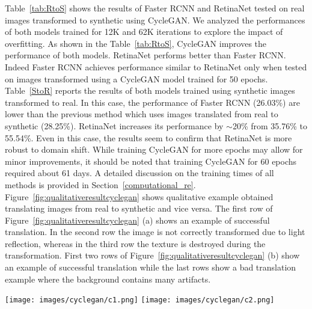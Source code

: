 \documentclass[preprint]{elsarticle}
\begin{document}
Table~\ref{tab:RtoS} shows the results of Faster RCNN and RetinaNet tested on real images transformed to synthetic using CycleGAN. We analyzed the performances of both models trained for 12K and 62K iterations to explore the impact of overfitting. As shown in the Table~\ref{tab:RtoS}, CycleGAN improves the performance of both models. RetinaNet performs better than Faster RCNN. Indeed Faster RCNN achieves performance similar to RetinaNet only when tested on images transformed using a CycleGAN model trained for 50 epochs. Table~\ref{StoR} reports the results of both models trained using synthetic images transformed to real. In this case, the performance of Faster RCNN (26.03\%) are lower than the previous method which uses images translated from real to synthetic (28.25\%). RetinaNet increases its performance by $\sim$20\% from 35.76\% to 55.54\%. Even in this case, the results seem to confirm that RetinaNet is more robust to domain shift. While training CycleGAN for more epochs may allow for minor improvements, it should be noted that training CycleGAN for 60 epochs required about 61 days.
A detailed discussion on the training times of all methods is provided in Section~\ref{computational_re}. Figure~\ref{fig:qualitativeresultcyclegan} shows qualitative example obtained translating images from real to synthetic and vice versa. The first row of Figure~\ref{fig:qualitativeresultcyclegan} (a) shows an example of successful translation. In the second row the image is not correctly transformed due to light reflection, whereas in the third row the texture is destroyed during the transformation. First two rows of Figure~\ref{fig:qualitativeresultcyclegan} (b) show an example of successful translation while the last rows show a bad translation example where the background contains many artifacts.
\begin{figure*}[t]
 \centering
    \texttt{[image: images/cyclegan/c1.png]}
    \quad
    \texttt{[image: images/cyclegan/c2.png]}
    \caption{Qualitative CycleGAN results. We show the source domain (real synthetic), the transformed image, and a reference image for visual comparison. Left: transformation from real to synthetic. Right: transformation from synthetic to real.}
    \label{fig:qualitativeresultcyclegan}
\end{figure*}
\end{document}
